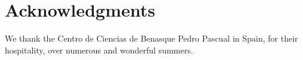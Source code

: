 \section{Acknowledgments}

We thank the Centro de Ciencias de Benasque Pedro Pascual in Spain,
for their hospitality, over numerous and wonderful summers.

\label{manualend}
